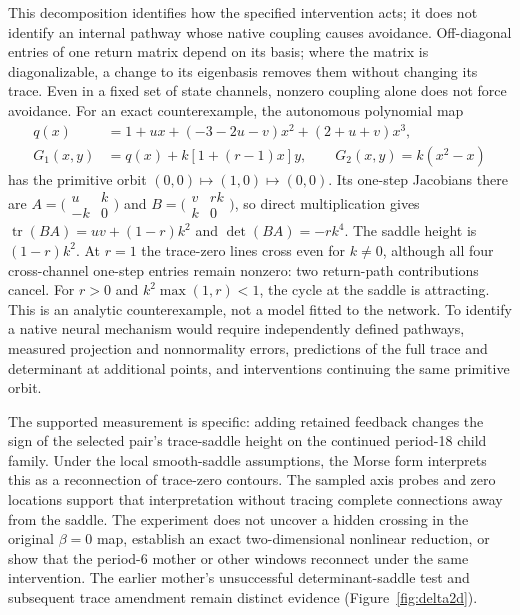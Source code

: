 \documentclass[11pt,letterpaper]{article}
\begin{document}
This decomposition identifies how the specified intervention acts; it does not identify an internal pathway
whose native coupling causes avoidance. Off-diagonal entries of one return matrix depend on its basis; where the
matrix is diagonalizable, a change to its eigenbasis removes them without changing its trace. Even in a fixed set of state channels,
nonzero coupling alone does not force avoidance. For an exact counterexample, the autonomous polynomial map
\begin{equation}
 \begin{split}
 q(x)&=1+ux+(-3-2u-v)x^2+(2+u+v)x^3,\\
 G_1(x,y)&=q(x)+k[1+(r-1)x]y,\qquad G_2(x,y)=k(x^2-x)
 \end{split}
 \label{eq:memorycounterexample}
\end{equation}
has the primitive orbit $(0,0)\mapsto(1,0)\mapsto(0,0)$. Its one-step Jacobians there are
$A=\bigl(\begin{smallmatrix}u&k\\-k&0\end{smallmatrix}\bigr)$ and
$B=\bigl(\begin{smallmatrix}v&rk\\k&0\end{smallmatrix}\bigr)$, so direct multiplication gives
$\operatorname{tr}(BA)=uv+(1-r)k^2$ and $\det(BA)=-rk^4$. The saddle height is $(1-r)k^2$.
At $r=1$ the trace-zero lines cross even for $k\ne0$, although all four cross-channel one-step entries remain
nonzero: two return-path contributions cancel. For $r>0$ and $k^2\max(1,r)<1$, the cycle at the saddle is
attracting. This is an analytic counterexample, not a model fitted to the network. To identify a native neural
mechanism would require independently defined pathways, measured projection and nonnormality errors, predictions
of the full trace and determinant at additional points, and interventions continuing the same primitive orbit.

The supported measurement is specific: adding retained feedback changes the sign of the selected pair's
trace-saddle height on the continued period-18 child family. Under the local smooth-saddle assumptions, the
Morse form interprets this as a reconnection of trace-zero contours. The sampled axis probes and zero locations
support that interpretation without tracing complete connections away from the saddle. The experiment does not uncover a hidden crossing in the
original $\beta=0$ map, establish an exact two-dimensional nonlinear reduction, or show that the period-6 mother
or other windows reconnect under the same intervention. The earlier mother's unsuccessful determinant-saddle
test and subsequent trace amendment remain distinct evidence (Figure~\ref{fig:delta2d}).
\end{document}
